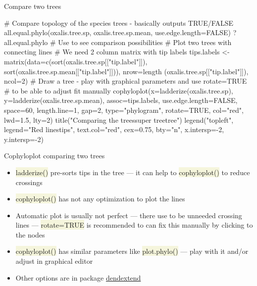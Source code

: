 \documentclass[compress, ucs, xelatex, 11pt, xcolor=svgnames, aspectratio=169,
	hyperref={
		bookmarks=true,
		unicode=true,
		colorlinks=true,
		pdftitle={Molecular data in R},
		plainpages=false,
		pdfauthor={Vojtech Zeisek},
		pdfsubject={Course about phylogeny and evolution in R},
		pdfcreator={XeLaTeX},
		pdfkeywords={R, evolution, phylogeny, molecular data},
		linkcolor=Crimson, %
		anchorcolor=Magenta, %
		citecolor=Magenta, %
		filecolor=Magenta, %
		menucolor=Magenta, %
		urlcolor=DodgerBlue, %
		pdftex},
	url={hyphens, lowtilde} %
	]{beamer}
\renewcommand{\texttt}[1]{\colorbox{Beige}{{\ttfamily #1}}}
\begin{document}
\begin{frame}[fragile]{Compare two trees}
	\begin{spluscode}
    # Compare topology of the species trees - basically outputs TRUE/FALSE
    all.equal.phylo(oxalis.tree.sp, oxalis.tree.sp.mean, use.edge.length=FALSE)
    ?all.equal.phylo # Use to see comparison possibilities
    # Plot two trees with connecting lines
    # We need 2 column matrix with tip labels
    tips.labels <- matrix(data=c(sort(oxalis.tree.sp[["tip.label"]]),
      sort(oxalis.tree.sp.mean[["tip.label"]])), nrow=length
      (oxalis.tree.sp[["tip.label"]]), ncol=2)
    # Draw a tree - play with graphical parameters and use rotate=TRUE
    # to be able to adjust fit manually
    cophyloplot(x=ladderize(oxalis.tree.sp), y=ladderize(oxalis.tree.sp.mean),
      assoc=tips.labels, use.edge.length=FALSE, space=60, length.line=1, gap=2,
      type="phylogram", rotate=TRUE, col="red", lwd=1.5, lty=2)
    title("Comparing the trees\nParsimony super tree\tSpecies tree")
    legend("topleft", legend="Red lines\nconnect tips", text.col="red",
      cex=0.75, bty="n", x.intersp=-2, y.intersp=-2)
	\end{spluscode}
\end{frame}

\begin{frame}{Cophyloplot comparing two trees}
	\begin{multicols}{2}
		\begin{center}
			\texttt{[image: cophyloplot.png]}
		\end{center}
		\begin{itemize}
			\item \texttt{ladderize()} pre-sorts tips in the tree --- it can help to \texttt{cophyloplot()} to reduce crossings
			\item \texttt{cophyloplot()} has not any optimization to plot the lines
			\item Automatic plot is usually not perfect --- there use to be unneeded crossing lines --- \texttt{rotate=TRUE} is recommended to can fix this manually by clicking to the nodes
			\item \texttt{cophyloplot()} has similar parameters like \texttt{plot.phylo()} --- play with it and/or adjust in graphical editor
			\item Other options are in package \href{https://CRAN.R-project.org/package=dendextend}{dendextend}
		\end{itemize}
	\end{multicols}
\end{frame}
\end{document}
